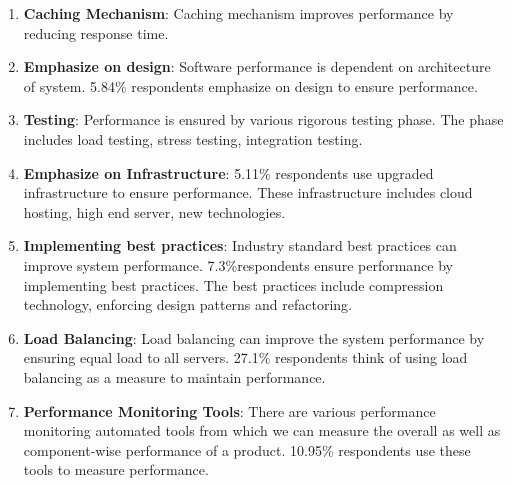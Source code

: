 \begin{enumerate}

    \item \textbf{Caching Mechanism}: Caching mechanism improves performance by reducing response time. 
    
    
    \item \textbf{Emphasize on design}: Software performance is dependent on architecture of system. 5.84\% respondents emphasize on design to ensure performance.
    
    
    \item \textbf{Testing}: Performance is ensured by various rigorous testing phase. The phase includes load testing, stress testing, integration testing.
    
    
    \item \textbf{Emphasize on Infrastructure}: 5.11\% respondents use upgraded infrastructure to ensure performance. These infrastructure includes cloud hosting, high end server, new technologies.
    
    
    \item \textbf{Implementing best practices}: Industry standard best practices can improve system performance. 7.3\%respondents ensure performance by implementing best practices. The best practices include compression technology, enforcing design patterns and refactoring.
    
    
    \item \textbf{Load Balancing}: Load balancing can improve the system performance by ensuring equal load to all servers. 27.1\% respondents think of using load balancing as a measure to maintain performance.
    
    \item \textbf{Performance Monitoring Tools}: There are various performance monitoring automated tools from which we can measure the overall as well as component-wise performance of a product. 10.95\% respondents use these tools to measure performance.
    

\end{enumerate}

